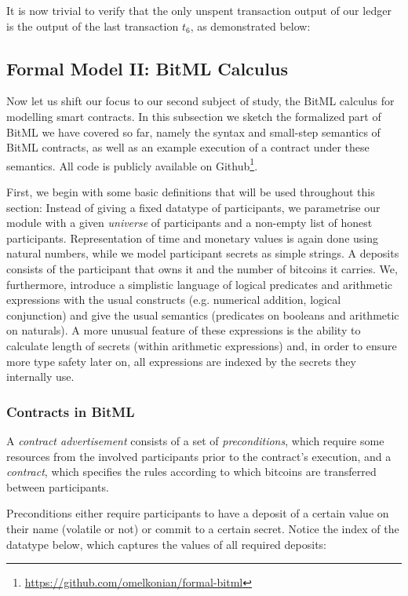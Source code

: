 \documentclass[acmsmall,nonacm=true,screen=true]{acmart}
\newcommand\site[1]{\footnote{\url{#1}}}
\begin{document}
It is now trivial to verify that the only unspent transaction output of our ledger is the output of the last
transaction $t_6$, as demonstrated below:
\UTXOexampleC{}

\subsection{Formal Model II: BitML Calculus} \label{subsec:bitml}
Now let us shift our focus to our second subject of study, the BitML calculus for modelling smart contracts.
In this subsection we sketch the formalized part of BitML we have covered so far, namely the syntax and small-step
semantics of BitML contracts, as well as an example execution of a contract under these semantics.
All code is publicly available on Github\site{https://github.com/omelkonian/formal-bitml}.

First, we begin with some basic definitions that will be used throughout this section:
\BITbasicTypesA{}
\BITbasicTypesB{}
Instead of giving a fixed datatype of participants, we parametrise our module with a given \textit{universe} of participants
and a non-empty list of honest participants.
Representation of time and monetary values is again done using natural numbers, while we model participant secrets as simple strings.
A deposits consists of the participant that owns it and the number of bitcoins it carries.
We, furthermore, introduce a simplistic language of logical predicates and arithmetic expressions with the usual constructs (e.g. numerical addition, logical conjunction) and give the usual semantics (predicates on booleans and arithmetic on naturals).
A more unusual feature of these expressions is the ability to calculate length of secrets (within arithmetic expressions)
and, in order to ensure more type safety later on, all expressions are indexed by the secrets they internally use.

\subsubsection{Contracts in BitML}
A \textit{contract advertisement} consists of a set of \textit{preconditions},
which require some resources from the involved participants prior to the contract's execution,
and a \textit{contract}, which specifies the rules according to which bitcoins are transferred between participants.

Preconditions either require participants to have a deposit of a certain value on their name (volatile or not) or 
commit to a certain secret. Notice the index of the datatype below, which captures the values of all required deposits:
\BITpreconditions{}
\end{document}
